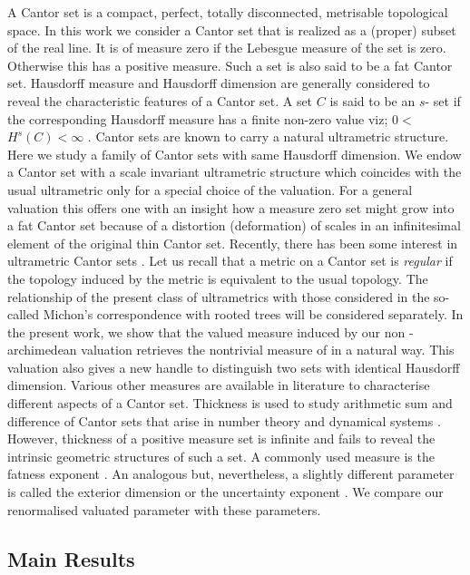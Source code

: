 \documentclass[12pt]{article}
\begin{document}
A Cantor set is a compact, perfect, totally disconnected, metrisable topological space. In this work we consider a Cantor set that is realized as a (proper) subset of  the real line. It is of measure zero if the Lebesgue measure of the
set is zero. Otherwise this has a positive measure. Such a set is also said
to be a fat Cantor set. Hausdorff measure and Hausdorff dimension are
generally considered to reveal the characteristic features of a Cantor set.
A set $C$ is said to be an $s$- set if the corresponding Hausdorff measure has a finite
non-zero value viz; $0<$ $H^{s}(C)<\infty $  \cite{falc}. Cantor sets are known to carry
a natural ultrametric structure. Here we study a family of Cantor sets with
same Hausdorff dimension. We endow a  Cantor set with a scale
invariant ultrametric structure which coincides with the usual ultrametric
only for a special choice of the valuation. For a general valuation this
offers one with an insight how a measure zero set might grow into a fat
Cantor set because of a distortion (deformation) of scales in an
infinitesimal element of the original thin Cantor set. Recently, there has 
been some interest in ultrametric Cantor sets \cite{pb, b1, sd1, sd2, ad}. Let us recall that a metric on a Cantor set is {\em regular} if the topology induced by the metric is equivalent to the usual topology. The relationship of the present class of  ultrametrics with those considered in  the so-called Michon's correspondence with rooted trees \cite{pb} will be considered separately. In the present work, we show that the valued measure induced by  our non - archimedean valuation retrieves the nontrivial measure of  \cite{pb} in a natural way. This valuation also gives a new handle to distinguish two sets with identical
Hausdorff dimension. Various other measures are available in literature to
characterise different aspects of a Cantor set. Thickness is used to study arithmetic sum and difference of Cantor sets that arise
in number theory and dynamical systems \cite{hall, newh}. However, thickness of a positive measure set is
infinite and fails to reveal the intrinsic geometric structures of such a
set. A commonly used measure is the fatness exponent \cite{far1, far2}. An analogous but, nevertheless, a  slightly
different parameter is called the exterior dimension or the uncertainty
exponent \cite{ott}. We compare our renormalised valuated parameter with these parameters.


\subsection{Main Results}
\end{document}
